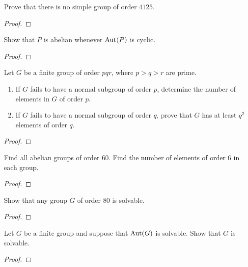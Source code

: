 \begin{problem}
Prove that there is no simple group of order $4125$.
\end{problem}
\begin{proof}

\end{proof}

\begin{problem}
Show that $P$ is abelian whenever $\operatorname{Aut}(P)$ is cyclic.
\end{problem}
\begin{proof}
\end{proof}

\begin{problem}
Let $G$ be a finite group of order $pqr$, where $p>q>r$ are
prime.
\begin{enumerate}[label=(\alph*)]
\item If $G$ fails to have a normal subgroup of order $p$,
determine the number of elements in $G$ of order $p$.
\item If $G$ fails to have a normal subgroup of order $q$,
prove that $G$ has at least $q^2$ elements of order $q$.
\end{enumerate}
\end{problem}
\begin{proof}
\end{proof}

\begin{problem}
Find all abelian groups of order $60$. Find the number of
elements of order $6$ in each group. %
\end{problem}
\begin{proof}
\end{proof}

\begin{problem}
Show that any group $G$ of order $80$ is solvable.
\end{problem}
\begin{proof}
\end{proof}

\begin{problem}
Let $G$ be a finite group and suppose that $\operatorname{Aut}(G)$ is
solvable. Show that $G$ is solvable.
\end{problem}
\begin{proof}
\end{proof}

